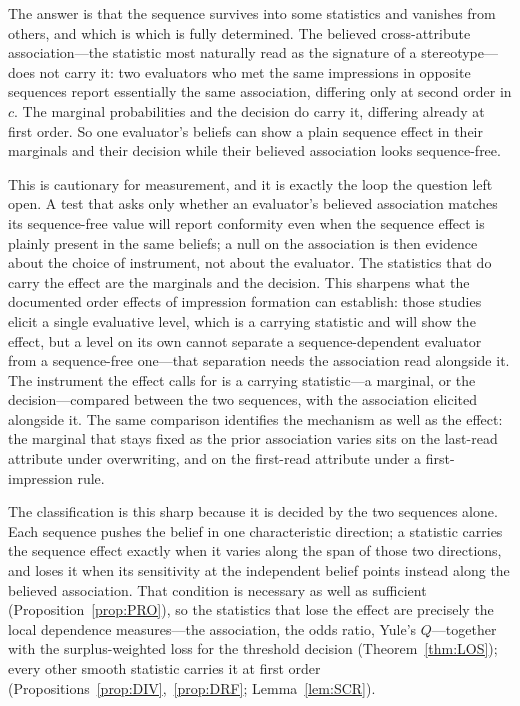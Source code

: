 
The answer is that the sequence survives into some statistics and vanishes from
others, and which is which is fully determined. The believed cross-attribute
association---the statistic most naturally read as the signature of a
stereotype---does not carry it: two evaluators who met the same impressions in
opposite sequences report essentially the same association, differing only at
second order in $c$. The marginal probabilities and the decision do carry it,
differing already at first order. So one evaluator's beliefs can show a plain
sequence effect in their marginals and their decision while their believed
association looks sequence-free.

This is cautionary for measurement, and it is exactly the loop the question left
open. A test that asks only whether an evaluator's believed association matches
its sequence-free value will report conformity even when the sequence effect is
plainly present in the same beliefs; a null on the association is then evidence
about the choice of instrument, not about the evaluator. The statistics that do
carry the effect are the marginals and the decision. This sharpens what the
documented order effects of impression formation
\citep{HogarthEinhorn1992,Asch1946} can establish: those studies elicit a single
evaluative level, which is a carrying statistic and will show the effect, but a
level on its own cannot separate a sequence-dependent evaluator from a
sequence-free one---that separation needs the association read alongside it. The
instrument the effect calls for is a carrying statistic---a marginal, or the
decision---compared between the two sequences, with the association elicited
alongside it. The same comparison identifies the mechanism as well as the
effect: the marginal that stays fixed as the prior association varies sits on
the last-read attribute under overwriting, and on the first-read attribute
under a first-impression rule.

The classification is this sharp because it is decided by the two sequences
alone. Each sequence pushes the belief in one characteristic direction; a
statistic carries the sequence effect exactly when it varies along the span of
those two directions, and loses it when its sensitivity at the independent belief
points instead along the believed association. That condition is necessary as
well as sufficient (Proposition~\ref{prop:PRO}), so the statistics that lose the
effect are precisely the local dependence measures---the association, the odds
ratio, Yule's $Q$---together with the surplus-weighted loss for the threshold
decision (Theorem~\ref{thm:LOS}); every other smooth statistic carries it at
first order (Propositions~\ref{prop:DIV},~\ref{prop:DRF}; Lemma~\ref{lem:SCR}).

